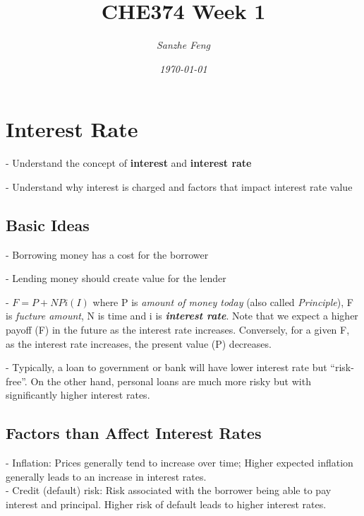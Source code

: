\documentclass{article}
\begin{document}
\begin{titlepage}

\title{\textbf{CHE374 Week 1}}
\author{\textit{Sanzhe Feng}}
\date{\textit{\today}}
\maketitle
\end{titlepage}

\setlength{\parindent}{0pt}

\section*{Interest Rate}
- Understand the concept of \textbf{interest} and \textbf{interest rate}

- Understand why interest is charged and factors that impact interest rate value

\subsection*{Basic Ideas}

- Borrowing money has a cost for the borrower

- Lending money should create value for the lender

- $F = P + NPi (I)$ where P is \emph{amount of money today} (also called \textit{Principle}), F is \emph{fucture amount}, N is time and i is \emph{\textbf{interest rate}}.
Note that we expect a higher payoff (F) in the future as the interest rate increases. Conversely, for a given F, as the interest rate increases,
the present value (P) decreases.

- Typically, a loan to government or bank will have lower interest rate but ``risk-free''. On the other hand, 
personal loans are much more risky but with significantly higher interest rates.

\subsection*{Factors than Affect Interest Rates}

- Inflation: Prices generally tend to increase over time; Higher expected inflation generally leads to an increase in interest rates.\\

- Credit (default) risk: Risk associated with the borrower being able to pay interest and principal. Higher risk of default leads to higher interest rates.\\
\end{document}
